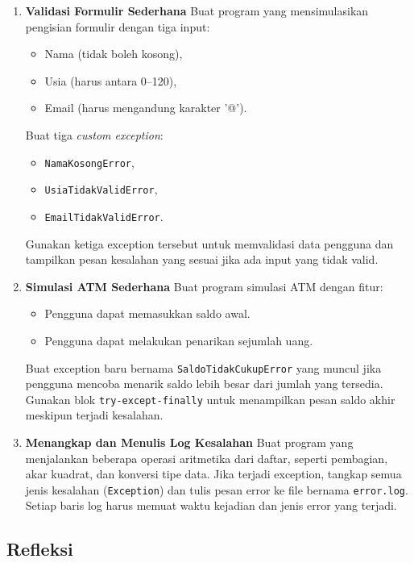 \begin{enumerate}
    \item \textbf{Validasi Formulir Sederhana}  
    Buat program yang mensimulasikan pengisian formulir dengan tiga input:
    \begin{itemize}
        \item Nama (tidak boleh kosong),
        \item Usia (harus antara 0–120),
        \item Email (harus mengandung karakter '@').
    \end{itemize}
    Buat tiga \textit{custom exception}:
    \begin{itemize}
        \item \texttt{NamaKosongError},
        \item \texttt{UsiaTidakValidError},
        \item \texttt{EmailTidakValidError}.
    \end{itemize}
    Gunakan ketiga exception tersebut untuk memvalidasi data pengguna dan tampilkan pesan kesalahan yang sesuai jika ada input yang tidak valid.

    \item \textbf{Simulasi ATM Sederhana}  
    Buat program simulasi ATM dengan fitur:
    \begin{itemize}
        \item Pengguna dapat memasukkan saldo awal.
        \item Pengguna dapat melakukan penarikan sejumlah uang.
    \end{itemize}
    Buat exception baru bernama \texttt{SaldoTidakCukupError} yang muncul jika pengguna mencoba menarik saldo lebih besar dari jumlah yang tersedia.  
    Gunakan blok \texttt{try-except-finally} untuk menampilkan pesan saldo akhir meskipun terjadi kesalahan.

    \item \textbf{Menangkap dan Menulis Log Kesalahan}  
    Buat program yang menjalankan beberapa operasi aritmetika dari daftar, seperti pembagian, akar kuadrat, dan konversi tipe data.  
    Jika terjadi exception, tangkap semua jenis kesalahan (\texttt{Exception}) dan tulis pesan error ke file bernama \texttt{error.log}.  
    Setiap baris log harus memuat waktu kejadian dan jenis error yang terjadi.
\end{enumerate}

\subsection*{Refleksi}

